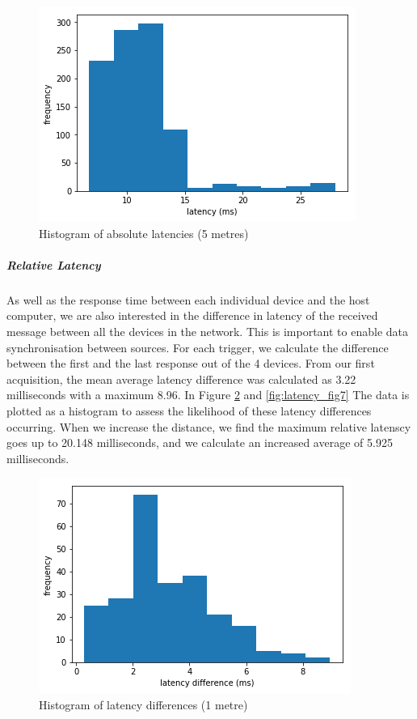 \begin{figure}[ht]
  \centering
    \includegraphics[width=\textwidth]{Chapters/Figures/technical/Latency/figure5.png}
    \caption{Histogram of absolute latencies (5 metres)}
    \label{fig:latency_fig5}
\end{figure}

\subparagraph{Relative Latency}

As well as the response time between each individual device and the host computer, we are also interested in the difference in latency of the received message between all the devices in the network. This is important to enable data synchronisation between sources. For each trigger, we calculate the difference between the first and the last response out of the 4 devices. From our first acquisition, the mean average latency difference was calculated as 3.22 milliseconds with a maximum 8.96. In Figure \ref{fig:latency_fig6} and \ref{fig:latency_fig7} The data is plotted as a histogram to assess the likelihood of these latency differences occurring. When we increase the distance, we find the maximum relative latenscy goes up to 20.148 milliseconds, and we calculate an increased average of 5.925 milliseconds.

\begin{figure}[ht]
  \centering
    \includegraphics[width=\textwidth]{Chapters/Figures/technical/Latency/figure6.png}
    \caption{Histogram of latency differences (1 metre)}
    \label{fig:latency_fig6}
\end{figure}

